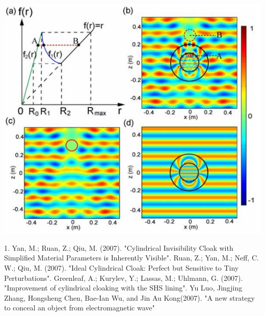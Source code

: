\documentclass[a4paper, 10pt, conference]{ieeeconf}      %
\begin{document}
\includegraphics[scale=0.55]{2}

     

\begin{thebibliography}{99}

 1.	 Yan, M.; Ruan, Z.; Qiu, M. (2007). "Cylindrical Invisibility Cloak with Simplified Material Parameters is Inherently Visible".
 Ruan, Z.; Yan, M.; Neff, C. W.; Qiu, M. (2007). "Ideal Cylindrical Cloak: Perfect but Sensitive to Tiny Perturbations". 
Greenleaf, A.; Kurylev, Y.; Lassas, M.; Uhlmann, G. (2007). "Improvement of cylindrical cloaking with the SHS lining".
 Yu Luo, Jingjing Zhang, Hongsheng Chen, Bae-Ian Wu, and Jin Au Kong(2007). "A new strategy to conceal an object from electromagnetic wave"





\end{thebibliography}
\end{document}
